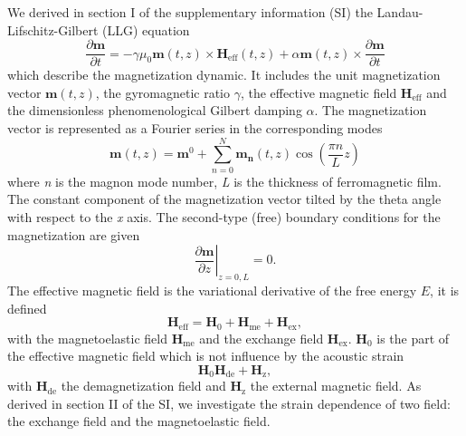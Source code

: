 \documentclass[%
superscriptaddress,
preprint,
showpacs,
amsmath,
amssymb,
aps,
prl,
]{revtex4-1}
\begin{document}
We derived in section I of the supplementary information (SI) the Landau-Lifschitz-Gilbert (LLG) equation
\begin{equation}
	\frac{\partial \mathbf{m}}{\partial t} = - \gamma \mu_0 \mathbf{m} \left( t, z \right) \times \mathbf{H}_{\mathrm{eff}} \left( t, z \right) + \alpha \mathbf{m} \left( t, z \right) \times \frac{\partial \mathbf{m}}{\partial t}
	\label{eq:LLG}
\end{equation}
which describe the magnetization dynamic.
It includes the unit magnetization vector $\mathbf{m}\left(t,z\right)$, the gyromagnetic ratio $\gamma$, the effective magnetic field $\mathbf{H}_{\mathrm{eff}}$ and the dimensionless phenomenological Gilbert damping $\alpha$.
The magnetization vector is represented as a Fourier series in the corresponding modes 
\begin{equation}
	\mathbf{m} \left(t,z\right) = \mathbf{m}^0 + \sum_{n=0}^{N}{\mathbf{m_n}\left(t,z\right)} \cos \left({\frac{\pi n}{L}z} \right)
	\label{eq:Fourier}
\end{equation}
where \textit{n} is the magnon mode number, \textit{L} is the thickness of ferromagnetic film. The constant component of the magnetization vector tilted by the theta angle with respect to the \textit{x} axis.  The second-type (free) boundary conditions for the magnetization are given
\begin{equation}
	\left.\frac{\partial \mathbf{m}}{\partial z}\right|_{z=0,L} = 0.
	\label{eq:Boundary_cond}
\end{equation}
The effective magnetic field is the variational derivative of the free energy $E$, it is defined
\begin{equation}
    \mathbf{H}_{\mathrm{eff}} = \mathbf{H}_0 + \mathbf{H}_{\mathrm{me}} + \mathbf{H}_{\mathrm{ex}},
    \label{eq:Heff}
\end{equation}
with the magnetoelastic field $\mathbf{H}_{\mathrm{me}}$ and the exchange field $\mathbf{H}_{\mathrm{ex}}$.
$\mathbf{H}_0$ is the part of the effective magnetic field which is not influence by the acoustic strain
\begin{equation}
    \mathbf{H}_0  \mathbf{H}_{\mathrm{de}} + \mathbf{H}_{\mathrm{z}},
\end{equation}
with $\mathbf{H}_{\mathrm{de}}$ the demagnetization field and $\mathbf{H}_{\mathrm{z}}$ the external magnetic field.
As derived in section II of the SI, we investigate the strain dependence of two field: the exchange field and the magnetoelastic field.
\end{document}

